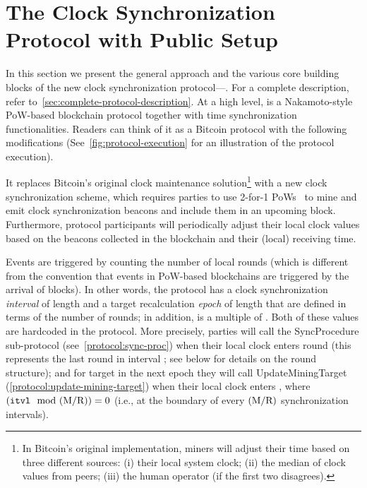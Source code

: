 \section{The Clock Synchronization Protocol with Public Setup}
\label{sec:protocol-details}

In this section we present the general approach and the various core building blocks of the new clock synchronization protocol---\timekeeper.
%
For a complete description, refer to~\cref{sec:complete-protocol-description}.
%
At a high level, \timekeeper is a Nakamoto-style PoW-based blockchain protocol together with time synchronization functionalities.
%
Readers can think of it as a Bitcoin protocol with the following modifications (See~\cref{fig:protocol-execution} for an illustration of the protocol execution).



\begin{cccItemize}[noitemsep]
    \item It replaces Bitcoin's original clock maintenance solution\footnote{In Bitcoin's original implementation, miners will adjust their time based on three different sources: (i) their local system clock; (ii) the median of clock values from peers; (iii) the human operator (if the first two disagrees).} with a new clock synchronization scheme, which requires parties to use 2-for-1 PoWs~\cite{EC:GarKiaLeo15} to mine and emit clock synchronization beacons and include them in an upcoming block.
    Furthermore, protocol participants will periodically adjust their local clock values based on the beacons collected in the blockchain and their (local) receiving time.

    \item Events are triggered by counting the number of local rounds (which is different from the convention that events in PoW-based blockchains are triggered by the arrival of blocks).
    In other words, the protocol has a clock synchronization \emph{interval} of length \syncLen and a target recalculation \emph{epoch} of length \diffLen that are defined in terms of the number of rounds; in addition, \diffLen is a multiple of \syncLen.
    Both of these values are hardcoded in the protocol.
    More precisely, parties will call the \textsf{SyncProcedure} sub-protocol (see~\cref{protocol:sync-proc}) when their local clock enters round \protocolTime{\interval}{\interval \cdot \syncLen} (this represents the last round in interval \interval; see below for details on the round structure); and for target in the next epoch they will call \textsf{UpdateMiningTarget} (\cref{protocol:update-mining-target}) when their local clock enters \protocolTime{\interval}{\interval \cdot \syncLen}, where $(\mathtt{itvl} \mod (\mathrm{M} / \mathrm{R})) = 0$ (i.e., at the boundary of every $(\mathrm{M} / \mathrm{R})$ synchronization intervals).
\end{cccItemize}


